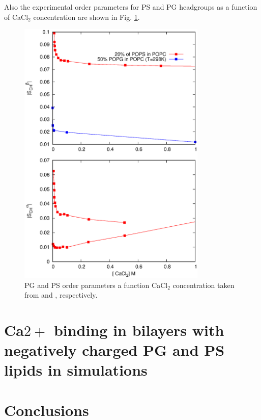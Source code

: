 \documentclass[aps,prl,superscriptaddress,twocolumn]{revtex4}
\begin{document}
Also the experimental order parameters for PS and PG headgroups
as a function of CaCl$_2$ concentration are shown in Fig. \ref{PSPGchangesWITHCaCl}.
\begin{figure}[]
  \centering
  \includegraphics[width=9.0cm]{../Figs/PSPGwithCaCl.eps}
  \caption{\label{PSPGchangesWITHCaCl}
    PG and PS order parameters a function CaCl$_2$ concentration taken from \cite{borle85} and \cite{roux90}, respectively.
  }
\end{figure}

\section{Ca$2+$ binding in bilayers with negatively charged PG and PS lipids in simulations}


\section{Conclusions}

%
\end{document}
